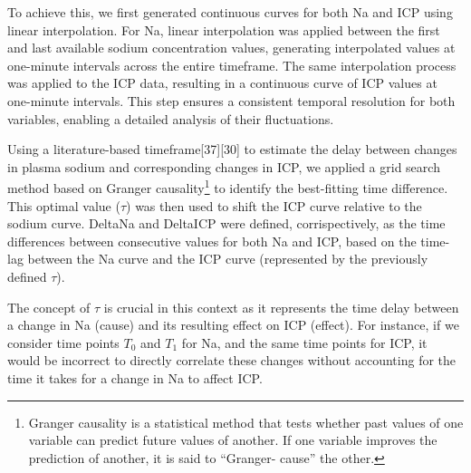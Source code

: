 To achieve this, we first generated continuous curves for both Na and ICP using linear interpolation. For Na, linear interpolation was applied between the first and last available sodium concentration values, generating interpolated values at one-minute intervals across the entire timeframe. The same interpolation process was applied to the ICP data, resulting in a continuous curve of ICP values at one-minute intervals. This step ensures a consistent temporal resolution for both variables, enabling a detailed analysis of their fluctuations.

Using a literature-based timeframe[37][30] to estimate the delay between changes in plasma sodium and corresponding changes in ICP, we applied a grid search method based on Granger causality\footnote{Granger causality is a statistical method that tests whether past values of one variable can predict future values of another. If one variable improves the prediction of another, it is said to “Granger- cause” the other.} to identify the best-fitting time difference. This optimal value ($\tau$) was then used to shift the ICP curve relative to the sodium curve. DeltaNa and DeltaICP were defined, corrispectively, as the time differences between consecutive values for both Na and ICP, based on the time-lag between the Na curve and the ICP curve (represented by the previously defined $\tau$).

The concept of $\tau$ is crucial in this context as it represents the time delay between a change in Na (cause) and its resulting effect on ICP (effect). For instance, if we consider time points $T_0$ and $T_1$ for Na, and the same time points for ICP, it would be incorrect to directly correlate these changes without accounting for the time it takes for a change in Na to affect ICP. 



